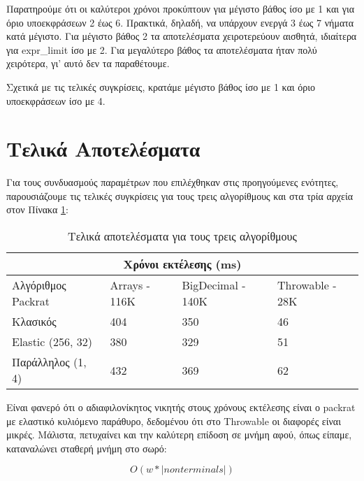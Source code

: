 Παρατηρούμε ότι οι καλύτεροι χρόνοι προκύπτουν για μέγιστο βάθος ίσο με 1 και για όριο υποεκφράσεων 2 έως 6.
Πρακτικά, δηλαδή, να υπάρχουν ενεργά 3 έως 7 νήματα κατά μέγιστο.
Για μέγιστο βάθος 2 τα αποτελέσματα χειροτερεύουν αισθητά, ιδιαίτερα για expr\_limit ίσο με 2.
Για μεγαλύτερο βάθος τα αποτελέσματα ήταν πολύ χειρότερα, γι' αυτό δεν τα παραθέτουμε.

Σχετικά με τις τελικές συγκρίσεις, κρατάμε μέγιστο βάθος ίσο με 1 και όριο υποεκφράσεων ίσο με 4.

\section{Τελικά Αποτελέσματα}

Για τους συνδυασμούς παραμέτρων που επιλέχθηκαν στις προηγούμενες ενότητες, παρουσιάζουμε τις τελικές συγκρίσεις για τους τρεις αλγορίθμους και στα τρία αρχεία στον Πίνακα \ref{table:results_final}:

\begin{table}[!ht]
\begin{tabular}{ |p{4cm}||p{3cm}|p{3cm}|p{3cm}|  }
 \hline
  \multicolumn{4}{|c|}{Χρόνοι εκτέλεσης (ms)} \\
 \hline
  Αλγόριθμος Packrat& Arrays - 116K &BigDecimal - 140K &Throwable - 28K\\
 \hline
 Κλασικός & 404 & 350 & \cellcolor{green!45}46\\
  Elastic (256, 32) & \cellcolor{green!45}380 & \cellcolor{green!45}329 & 51\\
  Παράλληλος (1, 4) & 432 & 369 & 62\\
 \hline
\end{tabular}
  \caption{Τελικά αποτελέσματα για τους τρεις αλγορίθμους}
  \label{table:results_final}
\end{table}

Είναι φανερό ότι ο αδιαφιλονίκητος νικητής στους χρόνους εκτέλεσης είναι ο packrat με ελαστικό κυλιόμενο παράθυρο, δεδομένου ότι στο Throwable οι διαφορές είναι μικρές.
Μάλιστα, πετυχαίνει και την καλύτερη επίδοση σε μνήμη αφού, όπως είπαμε, καταναλώνει σταθερή μνήμη στο σωρό:

\begin{equation}
O(w * |non terminals|)
\end{equation}
